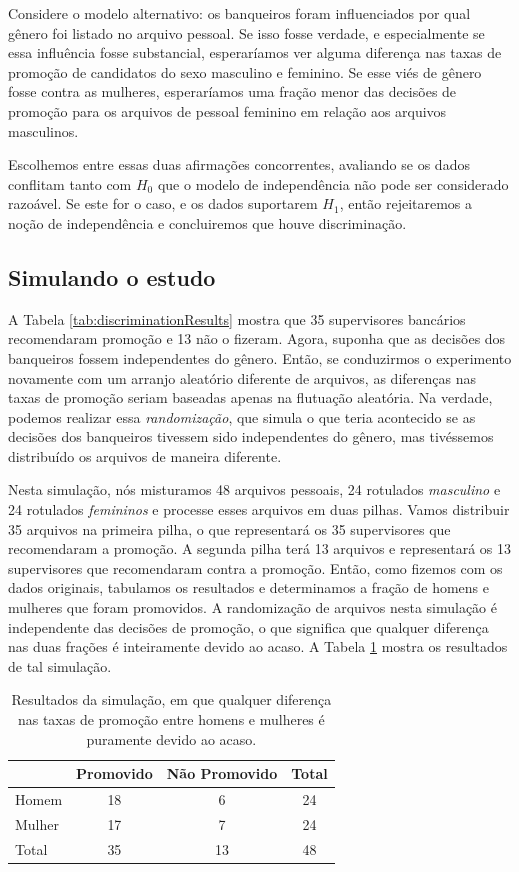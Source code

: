 \documentclass[
]{book}
\theoremstyle{definition}
\theoremstyle{definition}
\theoremstyle{definition}
\theoremstyle{definition}
\theoremstyle{remark}
\begin{document}
Considere o modelo alternativo: os banqueiros foram influenciados por qual gênero foi listado no arquivo pessoal. Se isso fosse verdade, e especialmente se essa influência fosse substancial, esperaríamos ver alguma diferença nas taxas de promoção de candidatos do sexo masculino e feminino. Se esse viés de gênero fosse contra as mulheres, esperaríamos uma fração menor das decisões de promoção para os arquivos de pessoal feminino em relação aos arquivos masculinos.

Escolhemos entre essas duas afirmações concorrentes, avaliando se os dados conflitam tanto com \(H_0\) que o modelo de independência não pode ser considerado razoável. Se este for o caso, e os dados suportarem \(H_1\), então rejeitaremos a noção de independência e concluiremos que houve discriminação.

\hypertarget{simulatingTheStudy}{%
\subsection{Simulando o estudo}\label{simulatingTheStudy}}

A Tabela \ref{tab:discriminationResults} mostra que 35 supervisores bancários recomendaram promoção e 13 não o fizeram. Agora, suponha que as decisões dos banqueiros fossem independentes do gênero. Então, se conduzirmos o experimento novamente com um arranjo aleatório diferente de arquivos, as diferenças nas taxas de promoção seriam baseadas apenas na flutuação aleatória. Na verdade, podemos realizar essa \emph{randomização}, que simula o que teria acontecido se as decisões dos banqueiros tivessem sido independentes do gênero, mas tivéssemos distribuído os arquivos de maneira diferente.

Nesta simulação, nós misturamos 48 arquivos pessoais, 24 rotulados \emph{masculino} e 24 rotulados \emph{femininos} e processe esses arquivos em duas pilhas. Vamos distribuir 35 arquivos na primeira pilha, o que representará os 35 supervisores que recomendaram a promoção. A segunda pilha terá 13 arquivos e representará os 13 supervisores que recomendaram contra a promoção. Então, como fizemos com os dados originais, tabulamos os resultados e determinamos a fração de homens e mulheres que foram promovidos. A randomização de arquivos nesta simulação é independente das decisões de promoção, o que significa que qualquer diferença nas duas frações é inteiramente devido ao acaso. A Tabela \ref{tab:discriminationRand1} mostra os resultados de tal simulação.

\begin{table}

\caption{\label{tab:discriminationRand1}Resultados da simulação, em que qualquer diferença nas taxas de promoção entre homens e mulheres é puramente devido ao acaso.}
\centering
\begin{tabular}[t]{l|c|c|c}
\hline
  & Promovido & Não Promovido & Total\\
\hline
Homem & 18 & 6 & 24\\
\hline
Mulher & 17 & 7 & 24\\
\hline
Total & 35 & 13 & 48\\
\hline
\end{tabular}
\end{table}
\end{document}
